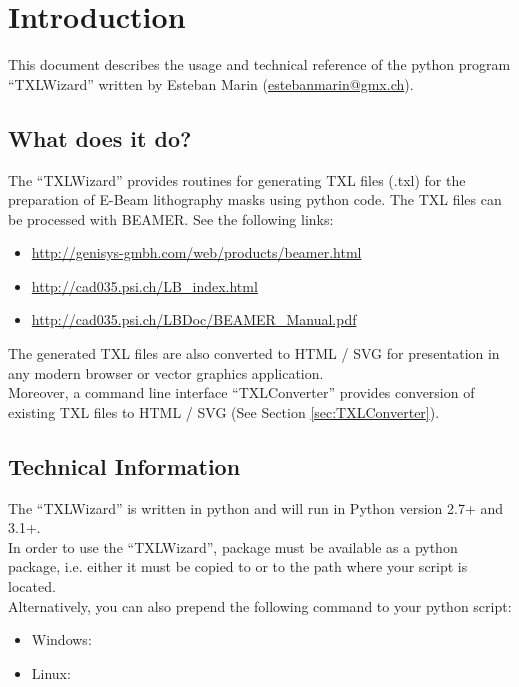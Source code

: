 \section{Introduction}
    This document describes the usage and technical reference of the python program ``TXLWizard''
    written by Esteban Marin (\href{mailto:estebanmarin@gmx.ch}{estebanmarin@gmx.ch}).\\

    \subsection{What does it do?}
        The ``TXLWizard'' provides routines for generating TXL files (.txl) for
        the preparation of E-Beam lithography masks using python code. The TXL files can be processed with BEAMER.
        See the following links:
        \begin{itemize}
            \item \url{http://genisys-gmbh.com/web/products/beamer.html}
            \item \url{http://cad035.psi.ch/LB_index.html}
            \item \url{http://cad035.psi.ch/LBDoc/BEAMER_Manual.pdf}
        \end{itemize}
        The generated TXL files are also converted to HTML / SVG for presentation in any modern browser or
        vector graphics application.\\
        Moreover, a command line interface ``TXLConverter'' provides conversion of existing TXL files to HTML / SVG
        (See Section \ref{sec:TXLConverter}).


    \subsection{Technical Information}
        The ``TXLWizard'' is written in python and will run in Python version 2.7+ and 3.1+.\\
        In order to use the ``TXLWizard'', package must be available as
        a python package, i.e. either it must be copied to  or
        to the path where your script is located. \\
        Alternatively, you can also prepend the following command to your python script:\\
        \begin{itemize}
            \item Windows: 
            \item Linux: 
        \end{itemize}


